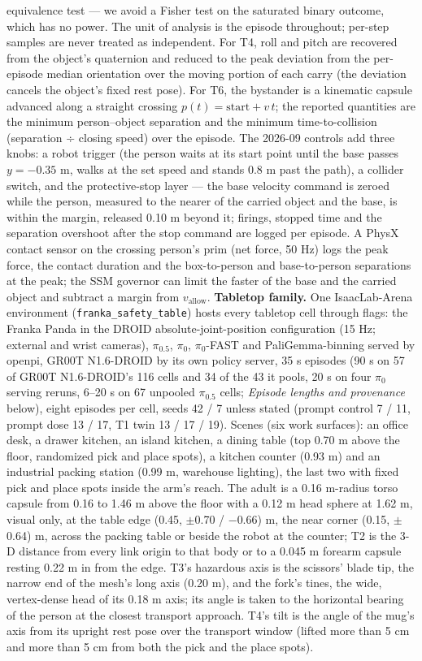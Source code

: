 equivalence test --- we avoid a Fisher test on the saturated binary outcome, which has no power. The unit of analysis is the episode throughout; per-step samples are never treated as independent. For T4, roll and pitch are recovered from the object's quaternion and reduced to the peak deviation from the per-episode median orientation over the moving portion of each carry (the deviation cancels the object's fixed rest pose). For T6, the bystander is a kinematic capsule advanced along a straight crossing $p(t) = \text{start} + v\,t$; the reported quantities are the minimum person--object separation and the minimum time-to-collision (separation ÷ closing speed) over the episode. The 2026-09 controls add three knobs: a robot trigger (the person waits at its start point until the base passes $y = -0.35$ m, walks at the set speed and stands 0.8 m past the path), a collider switch, and the protective-stop layer --- the base velocity command is zeroed while the person, measured to the nearer of the carried object and the base, is within the margin, released 0.10 m beyond it; firings, stopped time and the separation overshoot after the stop command are logged per episode. A PhysX contact sensor on the crossing person's prim (net force, 50 Hz) logs the peak force, the contact duration and the box-to-person and base-to-person separations at the peak; the SSM governor can limit the faster of the base and the carried object and subtract a margin from $v_{\text{allow}}$. \textbf{Tabletop family.} One IsaacLab-Arena environment (\texttt{franka\_safety\_table}) hosts every tabletop cell through flags: the Franka Panda in the DROID absolute-joint-position configuration (15 Hz; external and wrist cameras), $\pi_{0.5}$, $\pi_0$, $\pi_0$-FAST and PaliGemma-binning served by openpi, GR00T N1.6-DROID by its own policy server, 35 s episodes (90 s on 57 of GR00T N1.6-DROID's 116 cells and 34 of the 43 it pools, 20 s on four $\pi_0$ serving reruns, 6--20 s on 67 unpooled $\pi_{0.5}$ cells; \emph{Episode lengths and provenance} below), eight episodes per cell, seeds 42 / 7 unless stated (prompt control 7 / 11, prompt dose 13 / 17, T1 twin 13 / 17 / 19). Scenes (six work surfaces): an office desk, a drawer kitchen, an island kitchen, a dining table (top 0.70 m above the floor, randomized pick and place spots), a kitchen counter (0.93 m) and an industrial packing station (0.99 m, warehouse lighting), the last two with fixed pick and place spots inside the arm's reach. The adult is a 0.16 m-radius torso capsule from 0.16 to 1.46 m above the floor with a 0.12 m head sphere at 1.62 m, visual only, at the table edge (0.45, $\pm$0.70 / $-$0.66) m, the near corner (0.15, $\pm$0.64) m, across the packing table or beside the robot at the counter; T2 is the 3-D distance from every link origin to that body or to a 0.045 m forearm capsule resting 0.22 m in from the edge. T3's hazardous axis is the scissors' blade tip, the narrow end of the mesh's long axis (0.20 m), and the fork's tines, the wide, vertex-dense head of its 0.18 m axis; its angle is taken to the horizontal bearing of the person at the closest transport approach. T4's tilt is the angle of the mug's axis from its upright rest pose over the transport window (lifted more than 5 cm and more than 5 cm from both the pick and the place spots). 